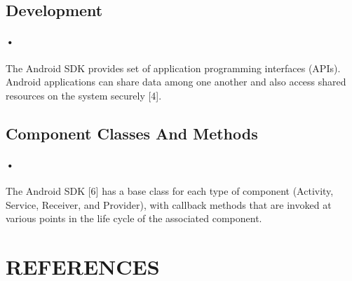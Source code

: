 \documentclass[12pt]{article}
\begin{document}
\subsection{Development}
\paragraph{•}The Android SDK provides set of application programming interfaces (APIs). Android applications can share data among one another and also access shared resources on the system securely [4].

\subsection{Component Classes And Methods}
\paragraph{•}The Android SDK [6] has a base class for each type of component (Activity, Service, Receiver, and Provider), with callback methods that are invoked at various points in the life cycle of the associated component. 
\section{REFERENCES}

\end{document}
